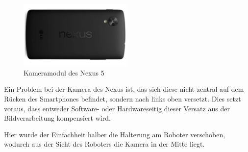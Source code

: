 \begin{figure}[h]
\centering
\includegraphics[width=0.5\textwidth]{Bilder/Robot/nexus_backside}
\caption{Kameramodul des Nexus 5}
\label{fig:camera}
\end{figure}

Ein Problem bei der Kamera des Nexus ist, das sich diese nicht zentral auf dem Rücken des Smartphones befindet, sondern nach links oben versetzt. Dies setzt voraus, dass entweder Software- oder Hardwareseitig dieser Versatz aus der Bildverarbeitung kompensiert wird.

Hier wurde der Einfachheit halber die Halterung am Roboter verschoben, wodurch aus der Sicht des Roboters die Kamera in der Mitte liegt.
